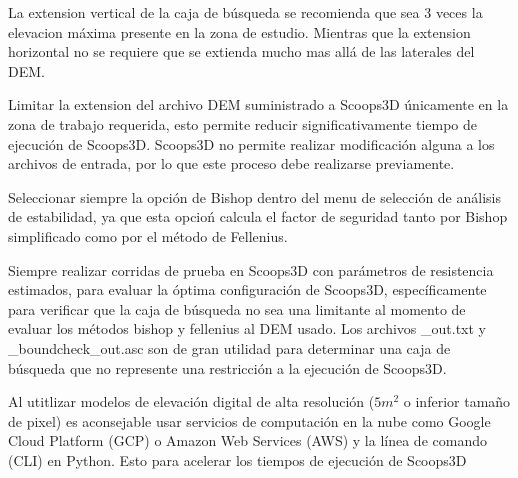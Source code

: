 La extension vertical de la caja de b\'usqueda se recomienda que sea 3 veces la elevacion m\'axima presente en la zona de estudio. Mientras que la extension horizontal no se requiere que se extienda mucho mas all\'a de las laterales del DEM.
  
Limitar la extension del archivo DEM suministrado a  Scoops3D \'unicamente en la zona de trabajo requerida, esto permite reducir significativamente tiempo de ejecuci\'on de Scoops3D. Scoops3D no permite realizar modificaci\'on alguna a los archivos de entrada, por lo que este proceso debe realizarse previamente.


Seleccionar siempre la opci\'on de Bishop dentro del menu de selecci\'on de an\'alisis de estabilidad, ya que esta opcio\'n calcula el factor de seguridad tanto por Bishop simplificado como por el m\'etodo de Fellenius.

Siempre realizar corridas de prueba en Scoops3D con par\'ametros de resistencia estimados, para evaluar la \'optima configuraci\'on de Scoops3D, espec\'ificamente para verificar que la caja de b\'usqueda no sea una limitante al momento de evaluar los m\'etodos bishop y fellenius al DEM usado. Los archivos \_out.txt y \_boundcheck\_out.asc son de gran utilidad para determinar una caja de b\'usqueda que no represente una restricci\'on a la ejecuci\'on de Scoops3D.



Al utitlizar modelos de elevaci\'on digital de alta resoluci\'on ($5m^{2}$ o inferior tama\~no de pixel) es aconsejable usar servicios de computaci\'on en la nube como Google Cloud Platform (GCP) o Amazon Web Services (AWS) y la l\'inea de comando (CLI) en Python. Esto para acelerar los tiempos de ejecuci\'on de Scoops3D